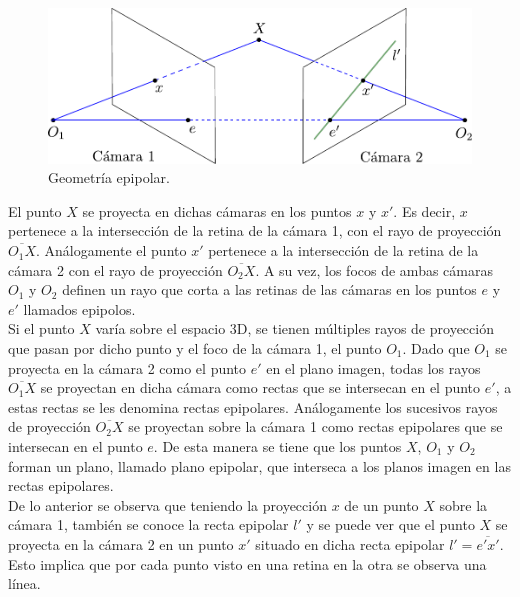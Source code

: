  \begin{figure}[ht!]
 \begin{center}
 \includegraphics[scale=0.7]{img/Reconstruccion/geometria_epipolar}
 \end{center}
 \caption{Geometría epipolar.}
 \label{fig: geometria_epipolar}
 \end{figure}
 
  El punto $X$ se proyecta en dichas cámaras en los puntos $x$ y $x'$. Es decir, $x$ pertenece a la intersección de la retina de la cámara 1, con el rayo de proyección $\overline{O_1X}$. Análogamente el punto $x'$ pertenece a la intersección de la retina de la cámara 2 con el rayo de proyección $\overline{O_2X}$. A su vez, los focos de ambas cámaras $O_1$ y $O_2$ definen un rayo que corta a las retinas de las cámaras en los puntos $e$ y $e'$ llamados epipolos.\\
  
  Si el punto $X$ varía sobre el espacio 3D, se tienen múltiples rayos de proyección que pasan por dicho punto y el foco de la cámara 1, el punto $O_1$. Dado que $O_1$ se proyecta en la cámara 2 como el punto $e'$ en el plano imagen, todas los rayos  $\overline{O_1X}$ se proyectan en dicha cámara como rectas que se intersecan en el punto $e'$, a estas rectas se les denomina rectas epipolares. Análogamente los sucesivos rayos de proyección $\overline{O_2X}$ se proyectan sobre la cámara 1 como rectas epipolares que se intersecan en el punto $e$. De esta manera se tiene que los puntos $X$, $O_1$ y $O_2$ forman un plano, llamado plano epipolar,  que interseca a los planos imagen en las rectas epipolares.\\
  
De lo anterior se observa que teniendo la proyección $x$ de un punto $X$ sobre la cámara 1, también se conoce la recta epipolar $l'$ y se puede ver que el punto $X$ se proyecta en la cámara 2 en un punto $x'$ situado en dicha recta epipolar $l'=\overline{e'x'}$. Esto implica que por cada punto visto en una retina en la otra se observa una línea.\\
 
